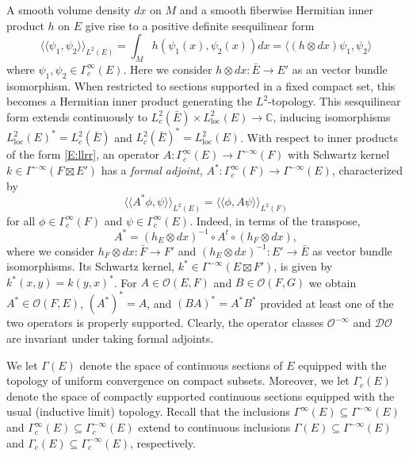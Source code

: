 \documentclass[reqno,12pt]{amsart}
\newcommand\llangle{\langle\!\langle}
\newcommand\rrangle{\rangle\!\rangle}
\newcommand{\DO}{\mathcal D\mathcal O}
\newcommand\C{\mathbb C}
\newcommand\loc{\textrm{loc}}
\theoremstyle{plain}
\theoremstyle{definition}
\begin{document}
A smooth volume density $dx$ on $M$ and a smooth fiberwise Hermitian inner product $h$ on $E$ give rise to a positive definite sesquilinear form
\begin{equation}\label{E:llrr}
\llangle\psi_1,\psi_2\rrangle_{L^2(E)}=\int_Mh(\psi_1(x),\psi_2(x))dx
=\langle(h\otimes dx)\psi_1,\psi_2\rangle
\end{equation}
where $\psi_1,\psi_2\in\Gamma_c^\infty(E)$.
Here we consider $h\otimes dx\colon \bar E\to E'$ as an vector bundle isomorphism.
When restricted to sections supported in a fixed compact set, this becomes a Hermitian inner product generating the $L^2$-topology.
This sesquilinear form extends continuously to $L^2_c(\bar E)\times L^2_\loc(E)\to\C$, inducing isomorphisms $L^2_\loc(E)^*=L^2_c(\bar E)$ and $L^2_c(\bar E)^*=L^2_\loc(E)$.
With respect to inner products of the form \eqref{E:llrr}, an operator $A\colon\Gamma^\infty_c(E)\to\Gamma^{-\infty}(F)$ with Schwartz kernel $k\in\Gamma^{-\infty}(F\boxtimes E')$ has a \emph{formal adjoint,} $A^*\colon\Gamma^\infty_c(F)\to\Gamma^{-\infty}(E)$, characterized by
\begin{equation}\label{E:A*}
\llangle A^*\phi,\psi\rrangle_{L^2(E)}=\llangle\phi,A\psi\rrangle_{L^2(F)}
\end{equation}
for all $\phi\in\Gamma^\infty_c(F)$ and $\psi\in\Gamma^\infty_c(E)$.
Indeed, in terms of the transpose,
\begin{equation}\label{E:A*At}
A^*=(h_E\otimes dx)^{-1}\circ A^t\circ(h_F\otimes dx),
\end{equation}
where we consider $h_F\otimes dx\colon\bar F\to F'$ and $(h_E\otimes dx)^{-1}\colon E'\to\bar E$ as vector bundle isomorphisms.
Its Schwartz kernel, $k^*\in\Gamma^{-\infty}(E\boxtimes F')$, is given by $k^*(x,y)=k(y,x)^*$.
For $A\in\mathcal O(E,F)$ and $B\in\mathcal O(F,G)$ we obtain $A^*\in\mathcal O(F,E)$, $(A^*)^*=A$, and $(BA)^*=A^*B^*$ provided at least one of the two operators is properly supported.
Clearly, the operator classes $\mathcal O^{-\infty}$ and $\DO$ are invariant under taking formal adjoints.


We let $\Gamma(E)$ denote the space of continuous sections of $E$ equipped with the topology of uniform convergence on compact subsets.
Moreover, we let $\Gamma_c(E)$ denote the space of compactly supported continuous sections equipped with the usual (inductive limit) topology.
Recall that the inclusions $\Gamma^\infty(E)\subseteq\Gamma^{-\infty}(E)$ and $\Gamma_c^\infty(E)\subseteq\Gamma^{-\infty}_c(E)$ extend to continuous inclusions $\Gamma(E)\subseteq\Gamma^{-\infty}(E)$ and $\Gamma_c(E)\subseteq\Gamma^{-\infty}_c(E)$, respectively.
\end{document}
